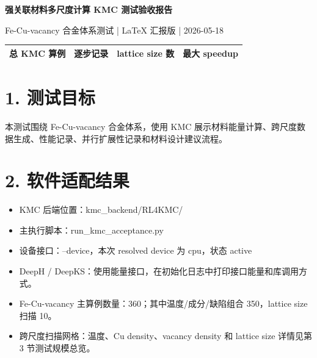 \documentclass[UTF8,11pt,fontset=none]{ctexart}
\renewcommand{\arraystretch}{1.18}
\begin{document}
\begin{center}
{\LARGE\bfseries 强关联材料多尺度计算 KMC 测试验收报告}\par
\vspace{0.35em}
{\normalsize Fe-Cu-vacancy 合金体系测试 | LaTeX 汇报版 | 2026-05-18}\par
\end{center}
\vspace{0.65em}

\begin{center}
\renewcommand{\arraystretch}{1.45}
\begin{tabularx}{\linewidth}{|Y|Y|Y|Y|}
\hline
\centering{}\par{\small\color{kmcmuted} 总 KMC 算例} & \centering{}\par{\small\color{kmcmuted} 逐步记录} & \centering{}\par{\small\color{kmcmuted} lattice size 数} & \centering{}\par{\small\color{kmcmuted} 最大 speedup} \\
\hline
\end{tabularx}
\end{center}

\section*{1. 测试目标}
本测试围绕 Fe-Cu-vacancy 合金体系，使用 KMC 展示材料能量计算、跨尺度数据生成、性能记录、并行扩展性记录和材料设计建议流程。

\section*{2. 软件适配结果}
\begin{itemize}
\item KMC 后端位置：kmc\_backend/RL4KMC/
\item 主执行脚本：run\_kmc\_acceptance.py
\item 设备接口：--device，本次 resolved device 为 cpu，状态 active
\item DeepH / DeepKS：使用能量接口，在初始化日志中打印接口能量和库调用方式。
\item Fe-Cu-vacancy 主算例数量：360；其中温度/成分/缺陷组合 350，lattice size 扫描 10。
\item 跨尺度扫描网格：温度、Cu density、vacancy density 和 lattice size 详情见第 3 节测试规模总览。
\end{itemize}
\end{document}
